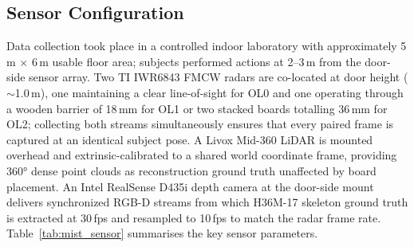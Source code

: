 \documentclass{article}
\begin{document}
\subsection{Sensor Configuration}
\label{app:mist_sensor}

Data collection took place in a controlled indoor laboratory with approximately
5\,m $\times$ 6\,m usable floor area; subjects performed actions at 2--3\,m
from the door-side sensor array.
Two TI IWR6843 FMCW radars are co-located at door height ($\sim$1.0\,m), one
maintaining a clear line-of-sight for OL0 and one operating through a wooden
barrier of 18\,mm for OL1 or two stacked boards totalling 36\,mm for OL2;
collecting both streams simultaneously ensures that every paired frame is
captured at an identical subject pose.
A Livox Mid-360 LiDAR is mounted overhead and extrinsic-calibrated to a shared
world coordinate frame, providing 360° dense point clouds as reconstruction
ground truth unaffected by board placement.
An Intel RealSense D435i depth camera at the door-side mount delivers
synchronized RGB-D streams from which H36M-17 skeleton ground truth is
extracted at 30\,fps and resampled to 10\,fps to match the radar frame rate.
Table~\ref{tab:mist_sensor} summarises the key sensor parameters.
\end{document}

